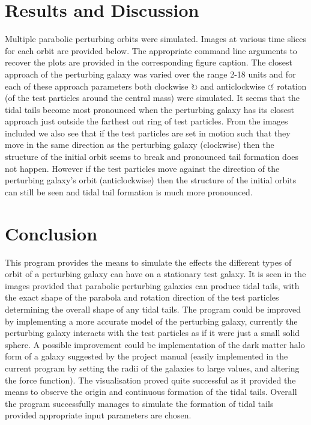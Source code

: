 \documentclass[10pt,a4paper]{article}
\begin{document}
\clearpage
\section{Results and Discussion}
Multiple parabolic perturbing orbits were simulated. Images at various time slices for each orbit are provided below. The appropriate command line arguments to recover the plots are provided in the corresponding figure caption. The closest approach of the perturbing galaxy was varied over the range 2-18 units and for each of these approach parameters both clockwise $\circlearrowright$ and anticlockwise $\circlearrowleft$ rotation (of the test particles around the central mass) were simulated. It seems that the tidal tails become most pronounced when the perturbing galaxy has its closest approach just outside the farthest out ring of test particles. From the images included we also see that if the test particles are set in motion such that they move in the same direction as the perturbing galaxy (clockwise) then the structure of the initial orbit seems to break and pronounced tail formation does not happen. However if the test particles move against the direction of the perturbing galaxy's orbit (anticlockwise) then the structure of the initial orbits can still be seen and tidal tail formation is much more pronounced.

\section{Conclusion}
This program provides the means to simulate the effects the different types of orbit of a perturbing galaxy can have on a stationary test galaxy. It is seen in the images provided that parabolic perturbing galaxies can produce tidal tails, with the exact shape of the parabola and rotation direction of the test particles determining the overall shape of any tidal tails. The program could be improved by implementing a more accurate model of the perturbing galaxy, currently the perturbing galaxy interacts with the test particles as if it were just a small solid sphere. A possible improvement could be implementation of the dark matter halo form of a galaxy suggested by the project manual (easily implemented in the current program by setting the radii of the galaxies to large values, and altering the force function). The visualisation proved quite successful as it provided the means to observe the origin and continuous formation of the tidal tails. Overall the program successfully manages to simulate the formation of tidal tails provided appropriate input parameters are chosen.
\end{document}
